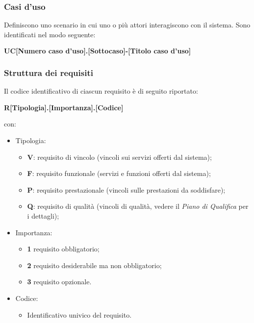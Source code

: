     \subsubsection{Casi d'uso}
    Definiscono uno scenario in cui uno o più attori interagiscono con il sistema. Sono identificati nel modo seguente:
    \begin{center}
      \textbf{UC[Numero caso d'uso].[Sottocaso]-[Titolo caso d'uso]}\\
    \end{center}
    \subsubsection{Struttura dei requisiti}
      Il codice identificativo di ciascun requisito è di seguito riportato:
      \begin{center}
        \textbf{R[Tipologia].[Importanza].[Codice]}\\
      \end{center}
      con:
      \begin{itemize}
        \item Tipologia:
        \begin{itemize}
          \item \textbf{V}: requisito di vincolo (vincoli sui servizi offerti dal sistema);
          \item \textbf{F}: requisito funzionale (servizi e funzioni offerti dal sistema);
          \item \textbf{P}: requisito prestazionale (vincoli sulle prestazioni da soddisfare);
          \item \textbf{Q}: requisito di qualità (vincoli di qualità, vedere il \textit{Piano di Qualifica} per i dettagli);
        \end{itemize}

        \item Importanza:
        \begin{itemize}
          \item \textbf{1} requisito obbligatorio;
          \item \textbf{2} requisito desiderabile ma non obbligatorio;
          \item \textbf{3} requisito opzionale.
        \end{itemize}

        \item Codice:
        \begin{itemize}
          \item Identificativo univico del requisito.
        \end{itemize}
        
      \end{itemize}

